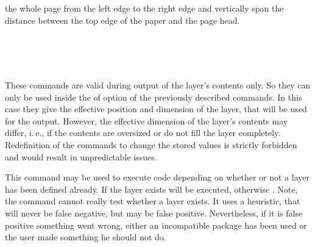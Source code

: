 \begin{desclist}
{    the whole page from the left edge to the right edge and vertically span
    the distance between the top edge of the paper and the page head.%
  }%
\end{desclist}
%
%
%
%
%
%

\begin{Declaration}
  \\
  \\
  \\
\end{Declaration}
%
%
%
%
These commands are valid during output of the layer's contents only. So they
can only be used inside the  of option  of the
previously described commands. In this case they give the effective position
and dimension of the layer, that will be used for the output. However, the
effective dimension of the layer's contents may differ, i.\,e., if the
contents are oversized or do not fill the layer completely. Redefinition of
the commands to change the stored values is strictly forbidden and would
result in unpredictable issues.%
%
%
%
%

\begin{Declaration}
\end{Declaration}
%
This command may be used to execute code depending on whether or not a layer
has been defined already. If the layer exists  will be
executed, otherwise . Note, the command cannot really
test whether a layer exists. It uses a heuristic, that will never be false
negative, but may be false positive. Nevertheless, if it is false positive
something went wrong, either an incompatible package has been used or the user
made something he should not do.%

